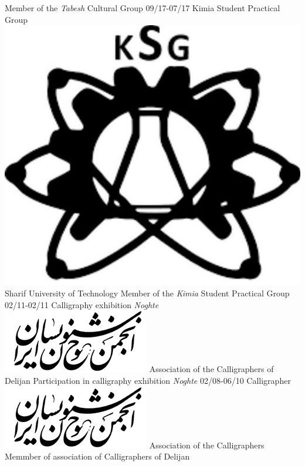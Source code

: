 \documentclass[a4paper]{friggeri-cv}
\begin{document}
\begin{entrylist}
     {Member of the \emph{Tabesh} Cultural Group}
    \entry
    {09/17-07/17}
    {   Kimia Student Practical Group}
    {\includegraphics[scale=0.03]{img/Kimia_logo.jpg} Sharif University of Technology}
    {Member of the \emph{Kimia} Student Practical Group}
    \entry
    {02/11-02/11}
    {    Calligraphy exhibition \emph{Noghte}}
    {\includegraphics[scale=0.1]{img/Khoshnevisan_logo.png} Association of the Calligraphers of Delijan}
    {Participation in calligraphy exhibition \emph{Noghte}}
    \entry
    {02/08-06/10}
    {   Calligrapher}
    {\includegraphics[scale=0.1]{img/Khoshnevisan_logo.png} Association of the Calligraphers}
    {Memmber of association of Calligraphers of Delijan}
\end{entrylist}
\\
\end{document}

